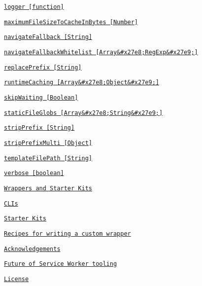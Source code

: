 \begin{DoxyItemize}
\begin{DoxyItemize}
\begin{DoxyItemize}
\item \href{#logger-function}{\tt logger \mbox{[}function\mbox{]}}
\item \href{#maximumfilesizetocacheinbytes-number}{\tt maximum\+File\+Size\+To\+Cache\+In\+Bytes \mbox{[}Number\mbox{]}}
\item \href{#navigatefallback-string}{\tt navigate\+Fallback \mbox{[}String\mbox{]}}
\item \href{#navigatefallbackwhitelist-arrayregexp}{\tt navigate\+Fallback\+Whitelist \mbox{[}Array\&\#x27e8;Reg\+Exp\&\#x27e9;\mbox{]}}
\item \href{#replaceprefix-string}{\tt replace\+Prefix \mbox{[}String\mbox{]}}
\item \href{#runtimecaching-arrayobject}{\tt runtime\+Caching \mbox{[}Array\&\#x27e8;Object\&\#x27e9;\mbox{]}}
\item \href{#skipwaiting-boolean}{\tt skip\+Waiting \mbox{[}Boolean\mbox{]}}
\item \href{#staticfileglobs-arraystring}{\tt static\+File\+Globs \mbox{[}Array\&\#x27e8;String\&\#x27e9;\mbox{]}}
\item \href{#stripprefix-string}{\tt strip\+Prefix \mbox{[}String\mbox{]}}
\item \href{#stripprefixmulti-object}{\tt strip\+Prefix\+Multi \mbox{[}Object\mbox{]}}
\item \href{#templatefilepath-string}{\tt template\+File\+Path \mbox{[}String\mbox{]}}
\item \href{#verbose-boolean}{\tt verbose \mbox{[}boolean\mbox{]}}
\end{DoxyItemize}
\end{DoxyItemize}
\item \href{#wrappers-and-starter-kits}{\tt Wrappers and Starter Kits}
\begin{DoxyItemize}
\item \href{#clis}{\tt C\+L\+Is}
\item \href{#starter-kits}{\tt Starter Kits}
\item \href{#recipes-for-writing-a-custom-wrapper}{\tt Recipes for writing a custom wrapper}
\end{DoxyItemize}
\item \href{#acknowledgements}{\tt Acknowledgements}
\item \href{#future-of-service-worker-tooling}{\tt Future of Service Worker tooling}
\item \href{#license}{\tt License}
\end{DoxyItemize}

